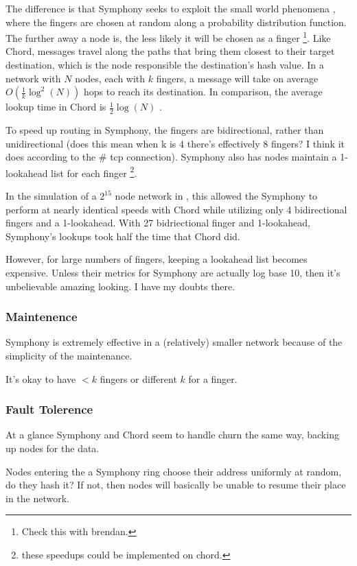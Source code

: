 \documentclass[conference, compsocconf, letterpaper]{IEEEtran}
\begin{document}
The difference is that Symphony seeks to exploit the small world phenomena \cite{kleinberg2000navigation}, where the fingers are chosen at random along a probability distribution function.  The further away a node is, the less likely it will be chosen as a finger \footnote{Check this with brendan.}.  Like Chord, messages travel along the paths that bring them closest to their target destination, which is the node responsible the destination's hash value.  In a network with  $N$ nodes, each with $k$ fingers, a message will take on average $O(\frac{1}{k} \log^{2}(N))$ hops to reach its destination.   In comparison, the average lookup time in Chord is $\frac{1}{2}\log(N)$ \cite{Chord}.

To speed up routing in Symphony, the fingers are bidirectional, rather than unidirectional (does this mean when k is 4 there's effectively 8 fingers?  I think it does according to the \# tcp connection).  Symphony also has nodes maintain a 1-lookahead list for each finger \footnote{these speedups could be implemented on chord.}.

In the simulation of a $2^15$ node network in \cite{Symphony}, this allowed the Symphony to perform at nearly identical speeds with Chord while utilizing only 4 bidirectional fingers and a 1-lookahead.  With 27 bidriectional finger and 1-lookahead, Symphony's lookups took half the time that Chord did. 

However, for large numbers of fingers, keeping a lookahead list becomes expensive.   Unless their metrics for Symphony are actually log base 10, then it's unbelievable amazing looking.  I have my doubts there.


\subsubsection{Maintenence}

Symphony is extremely effective in a (relatively) smaller network because of the simplicity of the maintenance.  

It's okay to have $<k$ fingers or different $k$ for a finger.

\subsubsection{Fault Tolerence}
At a glance Symphony and Chord seem to handle churn the same way, backing up nodes for the data.

Nodes entering the a Symphony ring choose their address uniformly at random, do they hash it?  If not, then nodes will basically be unable to resume their place in the network.
\end{document}
